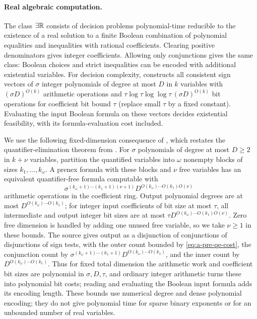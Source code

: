 \paragraph{Real algebraic computation.}
The class $\exists\mathbb{R}$ consists of decision problems polynomial-time reducible
to the existence of a real solution to a finite Boolean combination of
polynomial equalities and inequalities with rational coefficients.
Clearing positive denominators gives integer coefficients. Allowing only
conjunctions gives the same class: Boolean choices and strict inequalities
can be encoded with additional existential variables. For decision
complexity, \citet[Part III, Proposition 2.3 (restating Part I, Proposition 4.1)]{renegar1992-on-the-computational-complexity-and}
constructs all consistent sign vectors of $\sigma$ integer polynomials of
degree at most $D$ in $k$ variables with $(\sigma D)^{O(k)}$ arithmetic
operations and
$\tau\log\tau\log\log\tau\,(\sigma D)^{O(k)}$ bit operations for coefficient
bit bound $\tau$ (replace small $\tau$ by a fixed constant).
Evaluating the input Boolean formula on these vectors decides
existential feasibility, with its formula-evaluation cost included.

We use the following fixed-dimension consequence of
\citet[Theorem 2.27, Section 2.5.2]{basu2014-algorithms-in-real-algebraic-geometry},
which restates the quantifier-elimination theorem from
\citet[Chapter 14]{basu2006-algorithms-in-real-algebraic-geometry}.
For $\sigma$ polynomials of degree at most $D\ge2$ in $k+\nu$ variables,
partition the quantified variables into $\omega$ nonempty blocks of
sizes $k_1,\ldots,k_\omega$. A prenex formula with these blocks and
$\nu$ free variables has an equivalent quantifier-free formula
computable with
\begin{equation}
 \sigma^{(k_\omega+1)\cdots(k_1+1)(\nu+1)}
 D^{O(k_\omega)\cdots O(k_1)O(\nu)}
 \label{eq:a-pre-qe-cost}
\end{equation}
arithmetic operations in the coefficient ring. Output polynomial
degrees are at most $D^{O(k_\omega)\cdots O(k_1)}$; for integer input
coefficients of bit size at most $\tau$, all intermediate and output
integer bit sizes are at most
$\tau D^{O(k_\omega)\cdots O(k_1)O(\nu)}$.
Zero free dimension is handled by adding one unused free variable, so
we take $\nu\ge1$ in these bounds.
The source gives output as a disjunction of conjunctions of disjunctions
of sign tests, with the outer count bounded by
\cref{eq:a-pre-qe-cost}, the conjunction count by
$\sigma^{(k_\omega+1)\cdots(k_1+1)}D^{O(k_\omega)\cdots O(k_1)}$, and the
inner count by $D^{O(k_\omega)\cdots O(k_1)}$.
Thus for fixed total dimension the arithmetic work and coefficient bit
sizes are polynomial in $\sigma,D,\tau$, and ordinary integer arithmetic
turns these into polynomial bit costs; reading and evaluating the
Boolean input formula adds its encoding length. These bounds use
numerical degree and dense polynomial encoding; they do not give
polynomial time for sparse binary exponents or for an unbounded number
of real variables.

